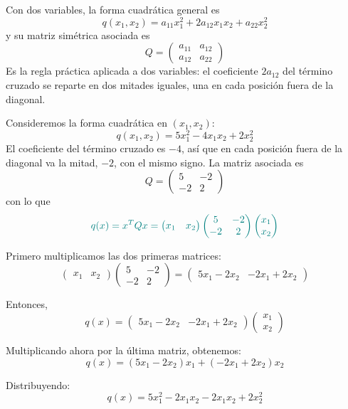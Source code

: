 \documentclass{article}
\begin{document}
Con dos variables, la forma cuadrática general es
\[
q(x_1,x_2) = a_{11}x_1^2 + 2a_{12}x_1x_2 + a_{22}x_2^2
\]
y su matriz simétrica asociada es
\[
Q = \begin{pmatrix}
a_{11} & a_{12}\\
a_{12} & a_{22}
\end{pmatrix}
\]
Es la regla práctica aplicada a dos variables: el coeficiente \(2a_{12}\) del término cruzado se reparte en dos mitades iguales, una en cada posición fuera de la diagonal.

Consideremos la forma cuadrática en \((x_1,x_2)\):
\[
q(x_1,x_2) = 5x_1^2 - 4x_1x_2 + 2x_2^2
\]
El coeficiente del término cruzado es \(-4\), así que en cada posición fuera de la diagonal va la mitad, \(-2\), con el mismo signo. La matriz asociada es
\[
Q = \begin{pmatrix}
5 & -2\\
-2 & 2
\end{pmatrix}
\]
con lo que
\[\color{teal}
q(x) = x^T Q x
= \begin{pmatrix}x_1 & x_2\end{pmatrix}
\begin{pmatrix}
5 & -2\\
-2 & 2
\end{pmatrix}
\begin{pmatrix}x_1\\ x_2\end{pmatrix}
\]

Primero multiplicamos las dos primeras matrices:
\[
\begin{pmatrix}x_1 & x_2\end{pmatrix}
\begin{pmatrix}
5 & -2\\
-2 & 2
\end{pmatrix}
=
\begin{pmatrix}
5x_1-2x_2
&
-2x_1+2x_2
\end{pmatrix}
\]

Entonces,
\[
q(x)
=
\begin{pmatrix}
5x_1-2x_2
&
-2x_1+2x_2
\end{pmatrix}
\begin{pmatrix}
x_1\\
x_2
\end{pmatrix}
\]

Multiplicando ahora por la última matriz, obtenemos:
\[
q(x)
=
(5x_1-2x_2)x_1
+
(-2x_1+2x_2)x_2
\]

Distribuyendo:
\[
q(x)
=
5x_1^2-2x_1x_2
-2x_1x_2+2x_2^2
\]
\end{document}
